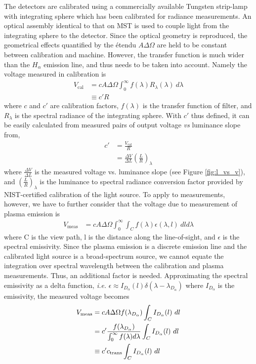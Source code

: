 The detectors are calibrated using a commercially available Tungsten strip-lamp with integrating sphere which has been calibrated for radiance measurements. An optical assembly identical to that on MST is used to couple light from the integrating sphere to the detector. Since the optical geometry is reproduced, the geometrical effects quantified by the {\'e}tendu $A\Delta\Omega$ are held to be constant between calibration and machine. However, the transfer function is much wider than the $H_{\alpha}$ emission line, and thus needs to be taken into account. Namely the voltage measured in calibration is
\begin{align}
    V_{\text{cal}} &= c A \Delta\Omega \int^{\infty}_{0}f(\lambda)R_\lambda(\lambda)\ d\lambda\\
    &\equiv c'R
\end{align}
where $c$ and $c'$ are calibration factors, $f(\lambda)$ is the transfer function of filter, and $R_\lambda$ is the spectral radiance of the integrating sphere. With $c'$ thus defined, it can be easily calculated from measured pairs of output voltage {\em vs} luminance slope from,
\begin{align}
    c' &= \frac{V_{\text{cal}}}{R}\\
    &= \frac{\Delta V}{\Delta L}\left(\frac{L}{R}\right)_{\lambda}
\end{align}
where $\frac{\Delta V}{\Delta L}$ is the measured voltage vs. luminance slope (see Figure \ref{fig:l_vs_v}), and $(\frac{L}{R})_{\lambda}$ is the luminance to spectral radiance conversion factor provided by NIST-certified calibration of the light source. To apply to measurements, however, we have to further consider that the voltage due to measurement of plasma emission is
\begin{align}
    V_{\text{meas}} &= c A\Delta\Omega\int^{\infty}_0\int_{C} f(\lambda)\epsilon(\lambda,l)\ dld\lambda
\end{align}
where C is the view path, l is the distance along the line-of-sight, and $\epsilon$ is the spectral emissivity. Since the plasma emission is a discrete emission line and the calibrated light source is a broad-spectrum source, we cannot equate the integration over spectral wavelength between the calibration and plasma measurements. Thus, an additional factor is needed. Approximating the spectral emissivity as a delta function, {\em i.e.} $\epsilon\approx I_{D_{\alpha}}(l)\delta(\lambda - \lambda_{D_{\alpha}})$ where $I_{D_\alpha}$ is the emissivity, the measured voltage becomes
\begin{align}
    V_{\text{meas}} &= c A\Delta\Omega f(\lambda_{D_{\alpha}}) \int_{C}I_{D_{\alpha}}(l)\ dl \nonumber\\
    &= c' \frac{f(\lambda_{D_{\alpha}})}{\int_0^{\infty}f(\lambda)d\lambda}\int_C I_{D_{\alpha}}(l)\ dl \\
    &\equiv c' c_{\text{trans}}\int_C I_{D_{\alpha}}(l)\ dl 
\end{align}
